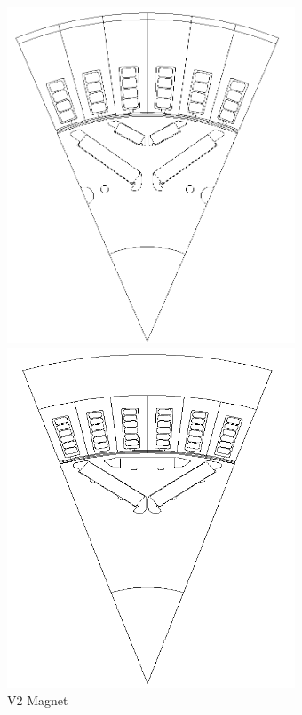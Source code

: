 \documentclass[a4paper,12pt]{article}
\begin{document}
\begin{figure}[h]
\begin{minipage}[b]{0.3\textwidth}
        \includegraphics[width=\textwidth]{./ReportImages/2V_Magnet.png}
        \caption{V2 Magnet}
        \label{fig:V2 Magnet}
    \end{minipage}
    \hfill
    \begin{minipage}[b]{0.3\textwidth}
        \includegraphics[width=\textwidth]{./ReportImages/Nabla_Magnet.png}

\end{minipage}
\end{figure}
\end{document}
